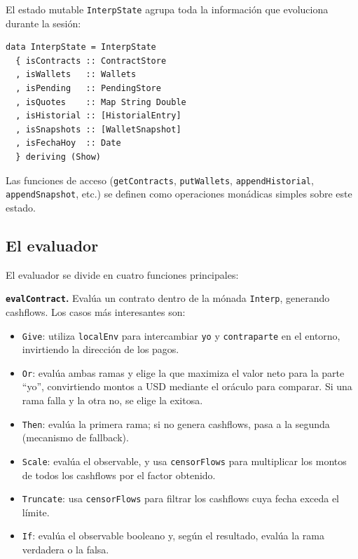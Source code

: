 \documentclass[a4paper, 12pt]{article}
\begin{document}
El estado mutable \texttt{InterpState} agrupa toda la información que evoluciona durante la sesión:

\begin{lstlisting}[caption={Estado mutable del intérprete (Monads.hs)}]
data InterpState = InterpState
  { isContracts :: ContractStore
  , isWallets   :: Wallets
  , isPending   :: PendingStore
  , isQuotes    :: Map String Double
  , isHistorial :: [HistorialEntry]
  , isSnapshots :: [WalletSnapshot]
  , isFechaHoy  :: Date
  } deriving (Show)
\end{lstlisting}

Las funciones de acceso (\texttt{getContracts}, \texttt{putWallets}, \texttt{appendHistorial}, \texttt{appendSnapshot}, etc.) se definen como operaciones monádicas simples sobre este estado.

\subsection{El evaluador}

El evaluador se divide en cuatro funciones principales:

\textbf{\texttt{evalContract}.} Evalúa un contrato dentro de la mónada \texttt{Interp}, generando cashflows. Los casos más interesantes son:

\begin{itemize}
    \item \texttt{Give}: utiliza \texttt{localEnv} para intercambiar \texttt{yo} y \texttt{contraparte} en el entorno, invirtiendo la dirección de los pagos.
    \item \texttt{Or}: evalúa ambas ramas y elige la que maximiza el valor neto para la parte ``yo'', convirtiendo montos a USD mediante el oráculo para comparar. Si una rama falla y la otra no, se elige la exitosa.
    \item \texttt{Then}: evalúa la primera rama; si no genera cashflows, pasa a la segunda (mecanismo de fallback).
    \item \texttt{Scale}: evalúa el observable, y usa \texttt{censorFlows} para multiplicar los montos de todos los cashflows por el factor obtenido.
    \item \texttt{Truncate}: usa \texttt{censorFlows} para filtrar los cashflows cuya fecha exceda el límite.
    \item \texttt{If}: evalúa el observable booleano y, según el resultado, evalúa la rama verdadera o la falsa.
\end{itemize}
\end{document}
